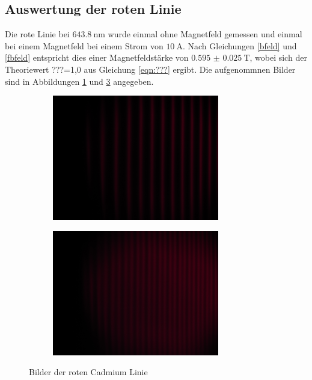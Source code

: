 \subsection{Auswertung der roten Linie}
Die rote Linie bei $\SI{643.8}{\nano\meter}$  wurde einmal ohne Magnetfeld gemessen und einmal
bei einem Magnetfeld bei einem Strom von $\SI{10}{\ampere}$. Nach Gleichungen
\ref{bfeld} und \ref{fbfeld} entspricht dies einer Magnetfeldstärke von $\SI{0.595(25)}{\tesla}$,
wobei sich der Theoriewert ???=1,0 aus Gleichung \ref{eqn:???} ergibt.
Die aufgenommnen Bilder sind in Abbildungen \ref{fig:rot1} und \ref{fig:rot2} angegeben.
\begin{figure}
\begin{subfigure}[c]{0.5\textwidth}

\includegraphics[width=0.8\textwidth]{Rot1.JPG}
\label{fig:rot1}
\end{subfigure}
\begin{subfigure}[c]{0.5\textwidth}
\includegraphics[width=0.8\textwidth]{Rot2.JPG}
\label{fig:rot2}
\end{subfigure}
\caption{Bilder der roten Cadmium Linie}
\end{figure}
